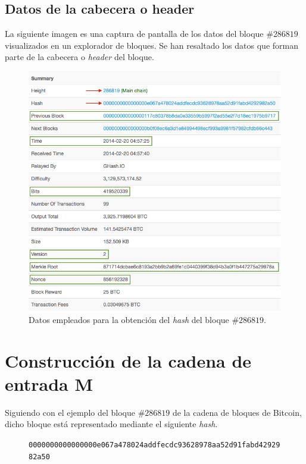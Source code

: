 \documentclass{article}
\begin{document}
    \subsection{Datos de la cabecera o header}
    La siguiente imagen es una captura de pantalla de los datos del bloque $\#286819$ visualizados en un explorador de bloques. Se han resaltado los datos que forman parte de la cabecera o \textit{header} del bloque.
    \begin{figure}[H]
    \centering
        \includegraphics[scale=0.47]{img/Bitcoin_block_SHA_256_Block_Data}
        \caption{Datos empleados para la obtención del \textit{hash} del bloque \#$286819$.}
    \end{figure}
    
    \vspace{3mm}
    
\section{Construcción de la cadena de entrada M}
    Siguiendo con el ejemplo del bloque $\#286819$ de la cadena de bloques de Bitcoin, dicho bloque está representado mediante el siguiente \textit{hash}.
    
    \begin{figure}[H]
        \centering
        \scriptsize{
        \texttt{0000000000000000e067a478024addfecdc93628978aa52d91fabd4292982a50}
        }
    \end{figure}
    
\end{document}
